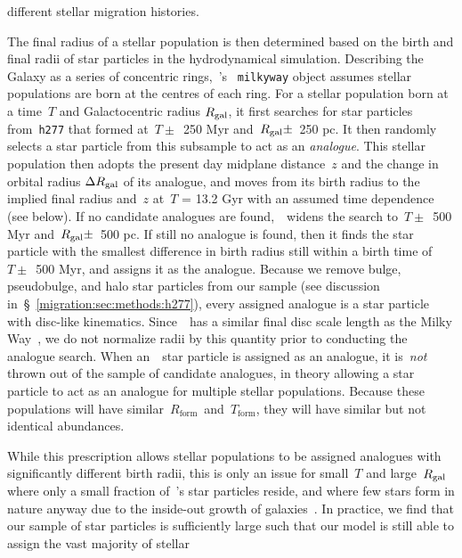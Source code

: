 different stellar migration histories. 
\par 
The final radius of a stellar population is then determined based on the birth 
and final radii of star particles in the hydrodynamical simulation. 
Describing the Galaxy as a series of concentric rings,~\vice's~
\texttt{milkyway} object assumes stellar populations are born at the centres of 
each ring. 
For a stellar population born at a time~$T$ and Galactocentric radius 
$R_\text{gal}$, it first searches for star particles from~\texttt{h277} that 
formed at~$T \pm$~250 Myr and~$R_\text{gal} \pm$~250 pc. 
It then randomly selects a star particle from this subsample to act as an 
\textit{analogue}. 
This stellar population then adopts the %
present day midplane 
distance~$z$ and the
change in orbital radius 
$\Delta R_\text{gal}$ of its analogue, and moves from its birth radius to the 
implied final radius and~$z$ at~$T$ = 13.2 Gyr with an assumed time dependence 
(see below). 
If no candidate analogues are found,~\vice~widens the search to~$T \pm$~500 Myr 
and~$R_\text{gal} \pm$~500 pc. 
If still no analogue is found, then it finds the star particle with the 
smallest difference in birth radius still within a birth time of $T \pm$~500 
Myr, and assigns it as the analogue. 
Because we remove bulge, pseudobulge, and halo star particles from our sample 
(see discussion in~\S~\ref{migration:sec:methods:h277}), every assigned analogue is a 
star particle with disc-like kinematics. 
Since~\hsim~has a similar final disc scale length as the Milky 
Way~\citep{Bird2021}, we do not normalize radii by this quantity prior to 
conducting the analogue search. 
When an~\hsim~star particle is assigned as an analogue, it is~\textit{not} 
thrown out of the sample of candidate analogues, in theory allowing a star 
particle to act as an analogue for multiple stellar populations. Because these 
populations will have similar~$R_\text{form}$~and~$T_\text{form}$, they will 
have similar but not identical abundances. 
\par 
While this prescription allows stellar populations to be assigned analogues 
with significantly different birth radii, this is only an issue for small~$T$ 
and large~$R_\text{gal}$ where %
only a small fraction of~\hsim's star 
particles reside,
and where few stars form in nature anyway due to the inside-out growth of 
galaxies~\citep[e.g.][]{Bird2013}. 
In practice, we find that our sample of star particles is sufficiently large 
such that our model is still able to assign the vast majority of stellar 
